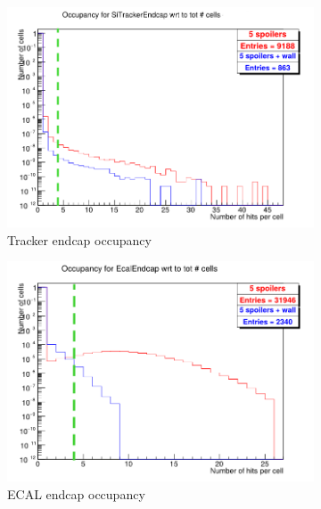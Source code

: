 \begin{figure}
    \centering
    \begin{subfigure}[b]{0.49\textwidth}
    \centering
        \includegraphics[height=0.27\textheight]{figures/SiTrackerEndcap_Occupancy.png}
        \caption{Tracker endcap occupancy}
	\label{fig:SiTracker_Occupancy}
    \end{subfigure}
    \begin{subfigure}[b]{0.49\textwidth}
    \centering
        \includegraphics[height=0.27\textheight]{figures/EcalEndcap_Occupancy.png}
        \caption{ECAL endcap occupancy}
        \label{fig:Ecal_Occupancy}
    \end{subfigure}\\
    \begin{subfigure}[b]{0.49\textwidth}

\end{subfigure}
\end{figure}
